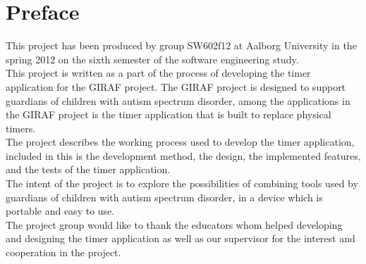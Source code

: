 \chapter*{Preface}
This project has been produced by group SW602f12 at Aalborg University in the spring 2012 on the sixth semester of the software engineering study.\\

This project is written as a part of the process of developing the timer application for the GIRAF project. The GIRAF project is designed to support guardians of children with autism spectrum disorder, among the applications in the GIRAF project is the timer application that is built to replace physical timers.\\

The project describes the working process used to develop the timer application, included in this is the development method, the design, the implemented features, and the tests of the timer application.\\

The intent of the project is to explore the possibilities of combining tools used by guardians of children with autism spectrum disorder, in a device which is portable and easy to use.\\

The project group would like to thank the educators whom helped developing and designing the timer application as well as our supervisor for the interest and cooperation in the project.